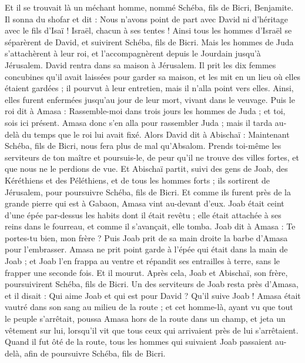 \begin{multicols}{2}
\VerseOne{}Et il se trouvait là un méchant homme, nommé Schéba, fils de Bicri, Benjamite. Il sonna du shofar et dit : Nous n'avons point de part avec David ni d'héritage avec le fils d'Isaï ! Israël, chacun à ses tentes !
Ainsi tous les hommes d'Israël se séparèrent de David, et suivirent Schéba, fils de Bicri. Mais les hommes de Juda s'attachèrent à leur roi, et l'accompagnèrent depuis le Jourdain jusqu'à Jérusalem.
David rentra dans sa maison à Jérusalem. Il prit les dix femmes concubines qu'il avait laissées pour garder sa maison, et les mit en un lieu où elles étaient gardées ; il pourvut à leur entretien, mais il n'alla point vers elles. Ainsi, elles furent enfermées jusqu'au jour de leur mort, vivant dans le veuvage.
Puis le roi dit à Amasa : Rassemble-moi dans trois jours les hommes de Juda ; et toi, sois ici présent.
Amasa donc s'en alla pour rassembler Juda ; mais il tarda au-delà du temps que le roi lui avait fixé.
Alors David dit à Abischaï : Maintenant Schéba, fils de Bicri, nous fera plus de mal qu'Absalom. Prends toi-même les serviteurs de ton maître et poursuis-le, de peur qu'il ne trouve des villes fortes, et que nous ne le perdions de vue.
Et Abischaï partit, suivi des gens de Joab, des Kéréthiens et des Péléthiens, et de tous les hommes forts ; ils sortirent de Jérusalem, pour poursuivre Schéba, fils de Bicri.
Et comme ils furent près de la grande pierre qui est à Gabaon, Amasa vint au-devant d'eux. Joab était ceint d'une épée par-dessus les habits dont il était revêtu ; elle était attachée à ses reins dans le fourreau, et comme il s'avançait, elle tomba.
Joab dit à Amasa : Te portes-tu bien, mon frère ? Puis Joab prit de sa main droite la barbe d'Amasa pour l'embrasser.
Amasa ne prit point garde à l'épée qui était dans la main de Joab ; et Joab l'en frappa au ventre et répandit ses entrailles à terre, sans le frapper une seconde fois. Et il mourut. Après cela, Joab et Abischaï, son frère, poursuivirent Schéba, fils de Bicri.
Un des serviteurs de Joab resta près d'Amasa, et il disait : Qui aime Joab et qui est pour David ? Qu'il suive Joab !
Amasa était vautré dans son sang au milieu de la route ; et cet homme-là, ayant vu que tout le peuple s'arrêtait, poussa Amasa hors de la route dans un champ, et jeta un vêtement sur lui, lorsqu'il vit que tous ceux qui arrivaient près de lui s'arrêtaient.
Quand il fut ôté de la route, tous les hommes qui suivaient Joab passaient au-delà, afin de poursuivre Schéba, fils de Bicri.

\end{multicols}
